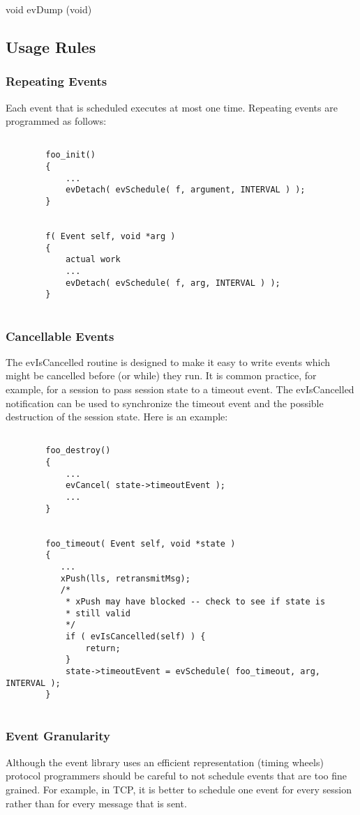 \medskip

{\sem void} {\bold evDump} ({\sem void})



\subsection{Usage Rules}

\subsubsection{Repeating Events}

Each event that is scheduled executes at most one time. Repeating
events are programmed as follows:

\begin{verbatim}

        foo_init()
        {
            ...
            evDetach( evSchedule( f, argument, INTERVAL ) );
        }
        
        
        f( Event self, void *arg )
        {
            actual work
            ...
            evDetach( evSchedule( f, arg, INTERVAL ) );
        }
        
\end{verbatim}


\subsubsection{Cancellable Events}

The evIsCancelled routine is designed to make it easy to write events
which might be cancelled before (or while) they run.  It is common
practice, for example, for a session to pass session state to a
timeout event.  The evIsCancelled notification can be used to
synchronize the timeout event and the possible destruction of the
session state.  Here is an example:


\begin{verbatim}

        foo_destroy()
        {
            ...
            evCancel( state->timeoutEvent );
            ...
        }
        
        
        foo_timeout( Event self, void *state )
        {
           ...
           xPush(lls, retransmitMsg);
           /* 
            * xPush may have blocked -- check to see if state is 
            * still valid
            */
            if ( evIsCancelled(self) ) {
                return;
            }
            state->timeoutEvent = evSchedule( foo_timeout, arg, INTERVAL );
        }
        
\end{verbatim}


\subsubsection{Event Granularity}

Although the event library uses an efficient representation (timing
wheels) protocol programmers should be careful to not schedule events
that are too fine grained. For example, in TCP, it is better to schedule
one event for every session rather than for every message that is
sent.
